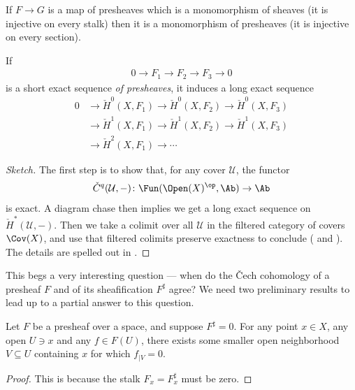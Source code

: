 \documentclass[11pt]{book}
\begin{document}
\begin{exercise}\label{exer:mono-sheaves-is-mono-presheaves} If $F \to G$ is a map of presheaves which is a monomorphism of sheaves (it is injective on every stalk) then it is a monomorphism of presheaves (it is injective on every section).
\end{exercise}


\begin{proposition}\label{prop:LES-Cech-cohomology-presheaves} 
If
\begin{align*}
    0 \to F_1 \to F_2 \to F_3 \to 0
\end{align*}
is a short exact sequence \emph{of presheaves}, it induces a long exact sequence
\begin{align*}
    0 &\to \check{H}^0(X,F_1) \to \check{H}^0(X,F_2) \to \check{H}^0(X,F_3) \\
    &\to \check{H}^1(X,F_1) \to \check{H}^1(X,F_2) \to \check{H}^1(X,F_3) \\
    &\to \check{H}^2(X,F_1) \to \cdots
\end{align*}
\end{proposition}
\begin{proof}[Sketch] The first step is to show that, for any cover $\mathcal{U}$, the functor
\begin{align*}
    \check{C}^q(\mathcal{U},-) \colon \Fun(\Open(X)^\op,\Ab) \to \Ab
\end{align*}
is exact. A diagram chase then implies we get a long exact sequence on $\check{H}^\ast(\mathcal{U},-)$. Then we take a colimit over all $\mathcal{U}$ in the filtered category of covers $\Cov(X)$, and use that filtered colimits preserve exactness to conclude ( and ). The details are spelled out in \cite[pp.~28--29]{Hirzebruch}.
\end{proof}

This begs a very interesting question --- when do the \v{C}ech cohomology of a presheaf $F$ and of its sheafification $F^\sharp$ agree? We need two preliminary results to lead up to a partial answer to this question.

\begin{proposition}\label{prop:property-of-pshf-sheafifying-to-zero} 
Let $F$ be a presheaf over a space, and suppose $F^\sharp = 0$. For any point $x\in X$, any open $U\ni x$ and any $f\in F(U)$, there exists some smaller open neighborhood $V \subseteq U$ containing $x$ for which $f_{|V} = 0$. 
\end{proposition}
\begin{proof} This is because the stalk $F_x = F^\sharp_x$ must be zero.
\end{proof}
\end{document}
